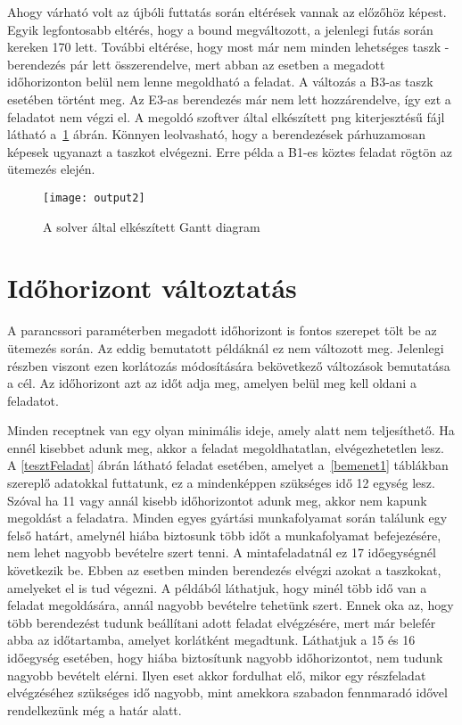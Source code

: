 Ahogy várható volt az újbóli futtatás során eltérések vannak az előzőhöz képest. Egyik legfontosabb eltérés, hogy a bound megváltozott, a jelenlegi futás során kereken 170 lett. További eltérése, hogy most már nem minden lehetséges taszk - berendezés pár lett összerendelve, mert abban az esetben a megadott időhorizonton belül nem lenne megoldható a feladat. A változás a B3-as taszk esetében történt meg. Az E3-as berendezés már nem lett hozzárendelve, így ezt a feladatot nem végzi el. A megoldó szoftver által elkészített png kiterjesztésű fájl látható a~\ref{output2} ábrán. Könnyen leolvasható, hogy a berendezések párhuzamosan képesek ugyanazt a taszkot elvégezni. Erre példa a B1-es köztes feladat rögtön az ütemezés elején. 

\begin{figure}[H]
\begin{center}
\texttt{[image: output2]}
\caption{A solver által elkészített Gantt diagram}
\label{output2}
\end{center}
\end{figure}

\section{Időhorizont változtatás}
A parancssori paraméterben megadott időhorizont is fontos szerepet tölt be az ütemezés során. Az eddig bemutatott példáknál ez nem változott meg. Jelenlegi részben viszont ezen korlátozás módosítására bekövetkező változások bemutatása a cél. Az időhorizont azt az időt adja meg, amelyen belül meg kell oldani a feladatot.

Minden receptnek van egy olyan minimális ideje, amely alatt nem teljesíthető. Ha ennél kisebbet adunk meg, akkor a feladat megoldhatatlan, elvégezhetetlen lesz. A \ref{tesztFeladat} ábrán látható feladat esetében, amelyet a~\ref{bemenet1} táblákban szereplő adatokkal futtatunk, ez a mindenképpen szükséges idő 12 egység lesz. Szóval ha 11 vagy annál kisebb időhorizontot adunk meg, akkor nem kapunk megoldást a feladatra. Minden egyes gyártási munkafolyamat során találunk egy felső határt, amelynél hiába biztosunk több időt a munkafolyamat befejezésére, nem lehet nagyobb bevételre szert tenni. A mintafeladatnál ez 17 időegységnél következik be. Ebben az esetben minden berendezés elvégzi azokat a taszkokat, amelyeket el is tud végezni. A példából láthatjuk, hogy minél több idő van a feladat megoldására, annál nagyobb bevételre tehetünk szert. Ennek oka az, hogy több berendezést tudunk beállítani adott feladat elvégzésére, mert már belefér abba az időtartamba, amelyet korlátként megadtunk. Láthatjuk a 15 és 16 időegység esetében, hogy hiába biztosítunk nagyobb időhorizontot, nem tudunk nagyobb bevételt elérni. Ilyen eset akkor fordulhat elő, mikor egy részfeladat elvégzéséhez szükséges idő nagyobb, mint amekkora szabadon fennmaradó idővel rendelkezünk még a határ alatt.  

